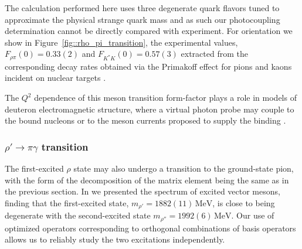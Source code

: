 The calculation performed here uses three degenerate quark flavors tuned to approximate the physical strange quark mass and as such our photocoupling determination cannot be directly compared with experiment. For orientation we show in Figure~\ref{fig::rho_pi_transition}, the experimental values, $F_{\rho \pi}(0) = 0.33(2)$ and $F_{K^{\!*}\!K}(0) = 0.57(3)$ extracted from the corresponding decay rates obtained via the Primakoff effect for pions and kaons incident on nuclear targets \cite{PhysRevD.33.3199,Capraro:1987rp,PhysRevLett.51.168}.


The $Q^2$ dependence of this meson transition form-factor plays a role in models of deuteron electromagnetic structure, where a virtual photon probe may couple to the bound nucleons or to the meson currents proposed to supply the binding \cite{Arnold:1979cg}.




\subsubsection{$\rho'\rightarrow\pi\gamma$ transition}
The first-excited $\rho$ state may also undergo a transition to the ground-state pion, with the form of the decomposition of the matrix element being the same as in the previous section. In  we presented the spectrum of excited vector mesons, finding that the first-excited state, $m_{\rho'} = 1882(11) \,\mathrm{MeV}$, is close to being degenerate with the second-excited state $m_{\rho''} = 1992(6) \,\mathrm{MeV}$. Our use of optimized operators corresponding to orthogonal combinations of basis operators allows us to reliably study the two excitations independently. 

